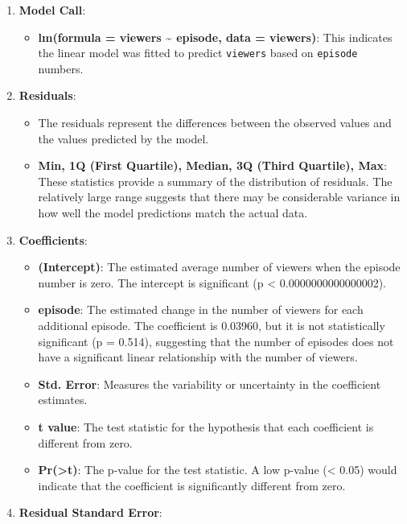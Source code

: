 \documentclass[
]{book}
\providecommand{\tightlist}{%
  \setlength{\itemsep}{0pt}\setlength{\parskip}{0pt}}
\begin{document}
\begin{enumerate}
\def\labelenumi{\arabic{enumi}.}
\tightlist
\item
  \textbf{Model Call}:

  \begin{itemize}
  \tightlist
  \item
    \textbf{lm(formula = viewers \textasciitilde{} episode, data = viewers)}: This indicates the linear model was fitted to predict \texttt{viewers} based on \texttt{episode} numbers.
  \end{itemize}
\item
  \textbf{Residuals}:

  \begin{itemize}
  \tightlist
  \item
    The residuals represent the differences between the observed values and the values predicted by the model.
  \item
    \textbf{Min, 1Q (First Quartile), Median, 3Q (Third Quartile), Max}: These statistics provide a summary of the distribution of residuals. The relatively large range suggests that there may be considerable variance in how well the model predictions match the actual data.
  \end{itemize}
\item
  \textbf{Coefficients}:

  \begin{itemize}
  \tightlist
  \item
    \textbf{(Intercept)}: The estimated average number of viewers when the episode number is zero. The intercept is significant (p \textless{} 0.0000000000000002).
  \item
    \textbf{episode}: The estimated change in the number of viewers for each additional episode. The coefficient is 0.03960, but it is not statistically significant (p = 0.514), suggesting that the number of episodes does not have a significant linear relationship with the number of viewers.
  \item
    \textbf{Std. Error}: Measures the variability or uncertainty in the coefficient estimates.
  \item
    \textbf{t value}: The test statistic for the hypothesis that each coefficient is different from zero.
  \item
    \textbf{Pr(\textgreater\textbar t\textbar)}: The p-value for the test statistic. A low p-value (\textless{} 0.05) would indicate that the coefficient is significantly different from zero.
  \end{itemize}
\item
  \textbf{Residual Standard Error}:


\end{enumerate}
\end{document}

